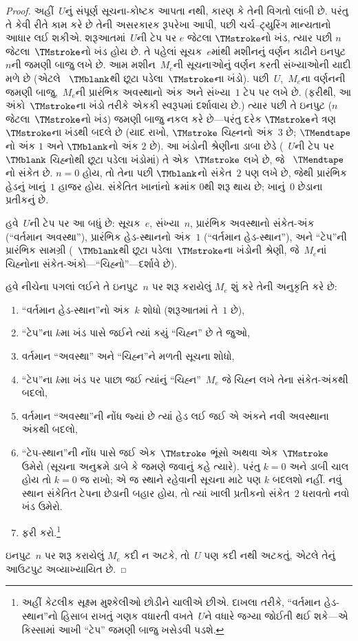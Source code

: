 \documentclass[../../../include/open-logic-section]{subfiles}
\begin{document}
\begin{proof}
  અહીં~$U$નું સંપૂર્ણ સૂચના-કોષ્ટક આપતા નથી, કારણ કે તેની
  વિગતો લાંબી છે. પરંતુ તે કેવી રીતે કામ કરે છે તેની
  અસરકારક રૂપરેખા આપી, પછી ચર્ચ--ટ્યુરિંગ માન્યતાનો
  આધાર લઈ શકીએ. શરૂઆતમાં~$U$ની ટેપ પર $e$ જેટલા
  $\TMstroke$નો ખંડ, ત્યાર પછી $n$ જેટલા~$\TMstroke$નો
  ખંડ હોય છે. તે પહેલાં સૂચક~$e$માંથી મશીનનું વર્ણન
  કાઢીને ઇનપુટ~$n$ની જમણી બાજુ લખે છે. આમ મશીન~$M_e$ની
  સૂચનાઓનું વર્ણન કરતી સંખ્યાઓની યાદી મળે છે (એટલે
  ~$\TMblank$થી છૂટા પડેલા~$\TMstroke$ના ખંડો).
  પછી~$U$,~$M_e$ના વર્ણનની જમણી બાજુ,~$M_e$ની પ્રારંભિક
  અવસ્થાનો અંક અને સંખ્યા~$1$ ટેપ પર લખે છે. (ફરીથી,
  આ અંકો~$\TMstroke$ના ખંડો તરીકે એકકી સ્વરૂપમાં દર્શાવાય
  છે.) ત્યાર પછી તે ઇનપુટ ($n$ જેટલા~$\TMstroke$નો ખંડ)
  જમણી બાજુ નકલ કરે છે---પરંતુ દરેક $\TMstroke$ને
  ત્રણ $\TMstroke$ના ખંડથી બદલે છે (યાદ રાખો,
  $\TMstroke$ ચિહ્નનો અંક~$3$ છે; $\TMendtape$નો અંક
  $1$ અને $\TMblank$નો અંક $2$ છે). આ ખંડોની શ્રેણીના
  ડાબા છેડે (~$U$ની ટેપ પર $\TMblank$ ચિહ્નોથી છૂટા
  પડેલા ખંડોમાં) તે એક~$\TMstroke$ લખે છે, જે
  ~$\TMendtape$નો સંકેત છે. $n=0$ હોય, તો તેના પછી
  $\TMblank$નો સંકેત~$2$ પણ લખે છે, જેથી પ્રારંભિક
  હેડનું ખાનું~$1$ હાજર હોય. સંકેતિત ખાનાંનો ક્રમાંક
  $0$થી શરૂ થાય છે; ખાનું~$0$ છેડાના પ્રતીકનું છે.

  હવે~$U$ની ટેપ પર આ બધું છે: સૂચક~$e$, સંખ્યા~$n$,
  પ્રારંભિક અવસ્થાનો સંકેત-અંક (``વર્તમાન અવસ્થા''),
  પ્રારંભિક હેડ-સ્થાનનો અંક~$1$ (``વર્તમાન હેડ-સ્થાન''),
  અને ``ટેપ''ની પ્રારંભિક સામગ્રી (~$\TMblank$થી છૂટા
  પડેલા~$\TMstroke$ના ખંડોની શ્રેણી, જે~$M_e$નાં
  ચિહ્નોના સંકેત-અંકો---``ચિહ્નો''---દર્શાવે છે).

  હવે નીચેના પગલાં લઈને તે ઇનપુટ~$n$ પર શરૂ કરાયેલું
  $M_e$ શું કરે તેની અનુકૃતિ કરે છે:
  \begin{enumerate}
    \item ``વર્તમાન હેડ-સ્થાન''નો અંક~$k$ શોધો
    (શરૂઆતમાં તે~$1$ છે),
    \item ``ટેપ''ના $k$મા ખંડ પાસે જઈને ત્યાં કયું
    ``ચિહ્ન'' છે તે જુઓ,
    \item{}%
    વર્તમાન ``અવસ્થા'' અને ``ચિહ્ન''ને મળતી સૂચના શોધો,
    \item ``ટેપ''ના $k$મા ખંડ પર પાછા જઈ ત્યાંનું
    ``ચિહ્ન''~$M_e$ જે ચિહ્ન લખે તેના સંકેત-અંકથી બદલો,
    \item વર્તમાન ``અવસ્થા''ની નોંધ જ્યાં છે ત્યાં હેડ
    લઈ જઈ એ અંકને નવી અવસ્થાના અંકથી બદલો,
    \item ``ટેપ-સ્થાન''ની નોંધ પાસે જઈ એક~$\TMstroke$
    ભૂંસો અથવા એક~$\TMstroke$ ઉમેરો (સૂચના અનુક્રમે
    ડાબે કે જમણે જવાનું કહે ત્યારે). પરંતુ $k=0$ અને
    ડાબી ચાલ હોય તો $k=0$ જ રાખો; એ જ સ્થાને રહેવાની
    સૂચના માટે પણ $k$ બદલશો નહીં. નવું સ્થાન સંકેતિત
    ટેપના છેડાની બહાર હોય, તો ત્યાં ખાલી પ્રતીકનો સંકેત~$2$
    ધરાવતો નવો ખંડ ઉમેરો.
    \item ફરી કરો.\footnote{અહીં કેટલીક સૂક્ષ્મ મુશ્કેલીઓ
    છોડીને ચાલીએ છીએ. દાખલા તરીકે, ``વર્તમાન હેડ-સ્થાન''નો
    હિસાબ રાખતું ગણક વધારતી વખતે~$U$ને વધારે જગ્યા
    જોઈતી થઈ શકે---એ કિસ્સામાં આખી ``ટેપ'' જમણી બાજુ
    ખસેડવી પડશે.}
  \end{enumerate}
  ઇનપુટ~$n$ પર શરૂ કરાયેલું $M_e$ કદી ન અટકે, તો~$U$
  પણ કદી નથી અટકતું, એટલે તેનું આઉટપુટ અવ્યાખ્યાયિત છે.


\end{proof}
\end{document}
